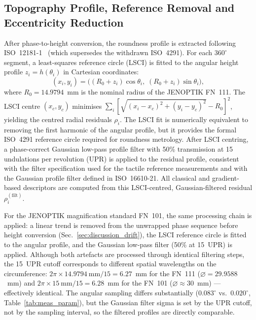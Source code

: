 \documentclass[review]{elsarticle}
\begin{document}
\subsection{Topography Profile, Reference Removal and Eccentricity Reduction}
\label{sec:topography}
After phase-to-height conversion, the roundness profile is extracted following ISO~12181-1~\cite{ISO12181-1} (which supersedes the withdrawn ISO~4291). For each $360^\circ$ segment, a least-squares reference circle (LSCI) is fitted to the angular height profile $z_i = h(\theta_i)$ in Cartesian coordinates:
\begin{equation}
(x_i, y_i) = \big((R_0 + z_i)\cos\theta_i,\; (R_0 + z_i)\sin\theta_i\big),
\end{equation}
where $R_0 = 14.9794$~mm is the nominal radius of the JENOPTIK FN~111. The LSCI centre $(x_c, y_c)$ minimises $\sum_i [\sqrt{(x_i-x_c)^2+(y_i-y_c)^2} - R_0]^2$, yielding the centred radial residuals $\rho_i$. The LSCI fit is numerically equivalent to removing the first harmonic of the angular profile, but it provides the formal ISO~4291 reference circle required for roundness metrology. After LSCI centring, a phase-correct Gaussian low-pass profile filter with 50\% transmission at 15 undulations per revolution (UPR) is applied to the residual profile, consistent with the filter specification used for the tactile reference measurements and with the Gaussian profile filter defined in ISO~16610-21. All classical and gradient-based descriptors are computed from this LSCI-centred, Gaussian-filtered residual $\rho_i^{(\mathrm{filt})}$.

For the JENOPTIK magnification standard FN~101, the same processing chain is applied: a linear trend is removed from the unwrapped phase sequence before height conversion (Sec.~\ref{sec:discussion_drift}), the LSCI reference circle is fitted to the angular profile, and the Gaussian low-pass filter (50\% at 15~UPR) is applied. Although both artefacts are processed through identical filtering steps, the 15~UPR cutoff corresponds to different spatial wavelengths on the circumference: $2\pi \times 14.9794~\mathrm{mm}/15 = 6.27$~mm for the FN~111 ($\varnothing=29.9588$~mm) and $2\pi \times 15~\mathrm{mm}/15 = 6.28$~mm for the FN~101 ($\varnothing \approx 30$~mm) — effectively identical. The angular sampling differs substantially ($0.083^\circ$ vs.\ $0.020^\circ$, Table~\ref{tab:meas_param}), but the Gaussian filter sigma is set by the UPR cutoff, not by the sampling interval, so the filtered profiles are directly comparable.
\end{document}
